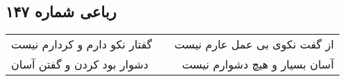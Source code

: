 \begin{center}
\section*{رباعی شماره ۱۴۷}
\label{sec:sh147}
\begin{longtable}{l p{0.5cm} r}
گفتار نکو دارم و کردارم نیست
&&
از گفت نکوی بی عمل عارم نیست
\\
دشوار بود کردن و گفتن آسان
&&
آسان بسیار و هیچ دشوارم نیست
\\
\end{longtable}
\end{center}
